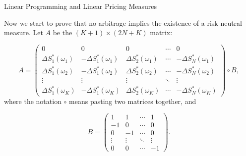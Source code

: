 \documentclass{beamer}
\begin{document}
\begin{frame}{Linear Programming and Linear Pricing Measures}

    {\footnotesize \footnotesize
     Now we start to prove that no arbitrage implies the existence of a risk neutral measure. Let $A$ be the $(K + 1) \times (2N + K)$ matrix:

    \[
    A = 
    \begin{pmatrix}
    0 & 0 & 0 & \cdots & 0 \\
    \Delta S^*_1(\omega_1) & -\Delta S^*_1(\omega_1) & \Delta S^*_2(\omega_1) & \cdots & -\Delta S^*_N(\omega_1) \\
    \Delta S^*_1(\omega_2) & -\Delta S^*_1(\omega_2) & \Delta S^*_2(\omega_2) & \cdots & -\Delta S^*_N(\omega_2) \\
    \vdots & \vdots & \vdots & \ddots & \vdots \\
    \Delta S^*_1(\omega_K) & -\Delta S^*_1(\omega_K) & \Delta S^*_2(\omega_K) & \cdots & -\Delta S^*_N(\omega_K)
    \end{pmatrix} \circ B,
    \]
     \pause where the notation $\circ$ means pasting two matrices together, and

    \[
    B = \begin{pmatrix}
    1 & 1 & \cdots & 1 \\
    -1 & 0 & \cdots & 0 \\
    0 & -1 & \cdots & 0 \\
    \vdots & \vdots & \ddots & \vdots \\
    0 & 0 & \cdots & -1
    \end{pmatrix}.
    \]

    }
\end{frame}
\end{document}
